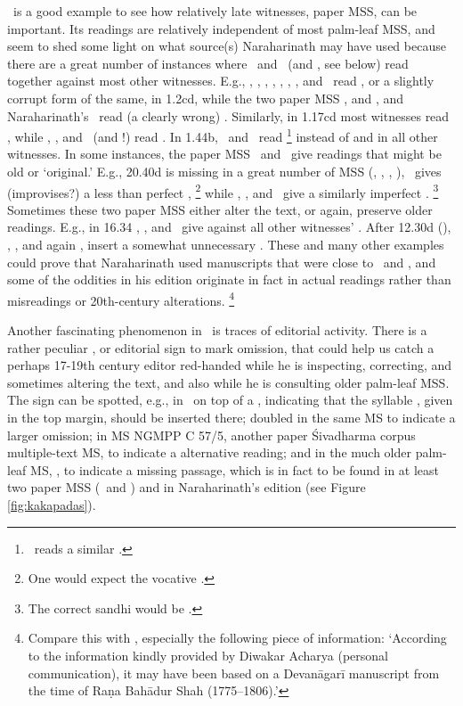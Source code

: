 \msPaperA\ is a good example to see how relatively
late witnesses, paper MSS, can be important. Its readings
are relatively independent of most palm-leaf MSS,
and seem to shed some light on what source(s) 
Naraharinath may have used because there
are a great number of instances where \Ed\ and \msPaperA\
(and \msPaperC, see below) 
read together against most other witnesses. E.g., \msCa, \msCb, \msCc, \msNa, \msNb, \msNc, \msNd, 
and \msM\ read \skt{bhāratasaṃhitām}, or a slightly
corrupt form of the same, in 1.2cd, while the two
paper MSS \msPaperA, and \msPaperC, 
and Naraharinath's \Ed\ read (a clearly wrong)
. Similarly, in 1.17cd most
witnesses read , while 
\msPaperA, \msPaperC, and \Ed\ (and \msM!) read
. In 1.44b, \msPaperA\ and
\Ed\ read %
		\footnote{\msPaperC\ reads a similar
					.}
instead of  and  
in all other witnesses.
In some instances, the paper
MSS \msPaperA\ and \msPaperC\ give readings
that might be old or `original.' E.g., 20.40d is missing
in a great number of MSS (\msCa, \msCb, \msNa, \msNb),
\msNc\ gives (improvises?) a less than perfect 
,%
		 \footnote{One would expect the vocative
		 				.}
while \msPaperA, \msPaperC, and \Ed\ give a similarly imperfect
.%
		 \footnote{The correct sandhi would be
		 				.}
Sometimes these two paper MSS either alter
the text, or again, preserve older readings. 
E.g., in 16.34 \msPaperA, \msPaperC, and \Ed\
give  against all other witnesses'
\skt{maheśvara uvāca}. After 12.30d (),
\msPaperA, \msPaperC, and again \Ed, insert
a somewhat unnecessary \skt{vipula uvāca}. These
and many other examples could prove that
Naraharinath used manuscripts that were close
to \msPaperA\ and \msPaperC,\label{narahari_paperms}
and some of the oddities in his edition originate in fact in 
actual readings rather than misreadings or
20th-century alterations.%
		\footnote{Compare this with 	
					, especially the
					following piece of information:
					`According to the information kindly
					provided by Diwakar Acharya (personal communication),
					it may have been based on a Devanāgarī manuscript 	
					from the time of Raṇa Bahādur Shah (1775--1806).'}

Another fascinating phenomenon in \msPaperA\ is
traces of editorial activity. There is a rather
peculiar \skt{kākapada}, or editorial sign to mark
omission, that could help us catch a perhaps
17-19th century editor red-handed while he is inspecting,
correcting, and sometimes altering the text, and 
also while he is consulting older palm-leaf MSS.
The sign can be spotted, e.g., in \msPaperA\
on top of a , indicating that the syllable , 
given in the top margin,
should be inserted there; 
doubled in the same MS to indicate a larger omission; 
in MS NGMPP C 57/5, another paper Śivadharma corpus
multiple-text MS, to indicate a alternative reading;
and in the much older palm-leaf MS, 
\msNa, to indicate a missing passage,
which is in fact to be found in at least two paper MSS 
(\msPaperA\ and \msPaperC) and in Naraharinath's
edition  (see Figure \ref{fig:kakapadas}).

